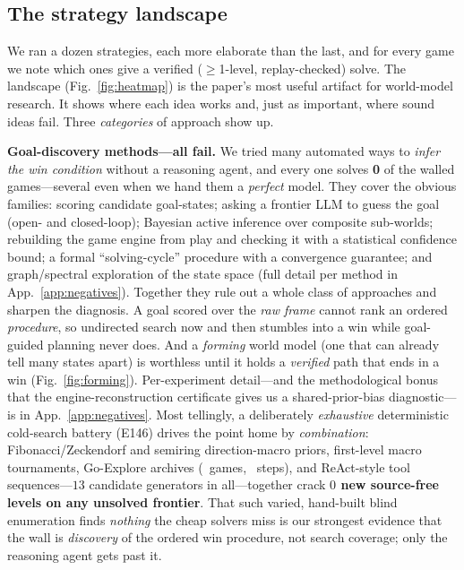 \documentclass[11pt]{article}
\begin{document}
\subsection{The strategy landscape}

\label{sec:landscape}
We ran a dozen strategies, each more elaborate than the last, and for every game we note which ones give a verified
($\geq$1-level, replay-checked) solve. The landscape (Fig.~\ref{fig:heatmap}) is the paper's most useful
artifact for world-model research. It shows where each idea works and, just as important, where
sound ideas fail. Three \emph{categories} of approach show up.

\textbf{Goal-discovery methods---all fail.} We tried many automated ways to \emph{infer the win condition} without a
reasoning agent, and every one solves \textbf{0} of the walled games---several even when we hand them a
\emph{perfect} model. They cover the obvious families: scoring candidate goal-states; asking a frontier LLM
to guess the goal (open- and closed-loop); Bayesian active inference over composite sub-worlds; rebuilding
the game engine from play and checking it with a statistical confidence bound; a formal ``solving-cycle''
procedure with a convergence guarantee; and graph/spectral exploration of the state space (full detail per
method in App.~\ref{app:negatives}). Together they rule out a whole class of approaches and sharpen the
diagnosis. A goal scored over the \emph{raw frame} cannot rank an ordered \emph{procedure}, so undirected
search now and then stumbles into a win while goal-guided planning never does. And a \emph{forming} world
model (one that can already tell many states apart) is worthless until it
holds a \emph{verified} path that ends in a win (Fig.~\ref{fig:forming}). Per-experiment detail---and the
methodological bonus that the engine-reconstruction certificate gives us a shared-prior-bias
diagnostic---is in App.~\ref{app:negatives}. Most tellingly, a deliberately \emph{exhaustive} deterministic
cold-search battery (E146) drives the point home by \emph{combination}: Fibonacci/Zeckendorf and semiring
direction-macro priors, first-level macro tournaments, Go-Explore archives (\ArcGoExploreN{}~games,
\ArcGoExploreSteps{}~steps), and ReAct-style tool sequences---$13$ candidate generators in all---together
crack \textbf{$0$ new source-free levels on any unsolved frontier}. That such varied, hand-built blind
enumeration finds \emph{nothing} the cheap solvers miss is our strongest evidence that the wall is
\emph{discovery} of the ordered win procedure, not search coverage; only the reasoning agent gets past it.
\end{document}
